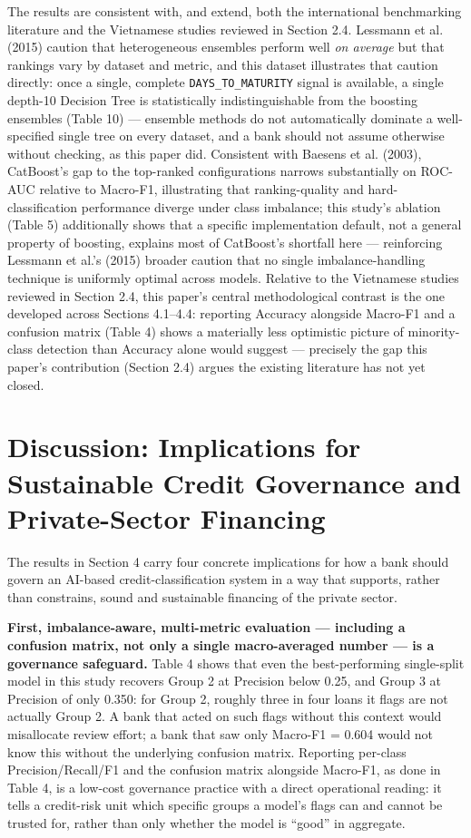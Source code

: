 \documentclass[11pt,a4paper]{article}
\begin{document}
The results are consistent with, and extend, both the international benchmarking literature and the Vietnamese studies reviewed in Section 2.4. Lessmann et al. (2015) caution that heterogeneous ensembles perform well \textit{on average} but that rankings vary by dataset and metric, and this dataset illustrates that caution directly: once a single, complete \texttt{DAYS\_TO\_MATURITY} signal is available, a single depth-10 Decision Tree is statistically indistinguishable from the boosting ensembles (Table 10) --- ensemble methods do not automatically dominate a well-specified single tree on every dataset, and a bank should not assume otherwise without checking, as this paper did. Consistent with Baesens et al. (2003), CatBoost's gap to the top-ranked configurations narrows substantially on ROC-AUC relative to Macro-F1, illustrating that ranking-quality and hard-classification performance diverge under class imbalance; this study's ablation (Table 5) additionally shows that a specific implementation default, not a general property of boosting, explains most of CatBoost's shortfall here --- reinforcing Lessmann et al.'s (2015) broader caution that no single imbalance-handling technique is uniformly optimal across models. Relative to the Vietnamese studies reviewed in Section 2.4, this paper's central methodological contrast is the one developed across Sections 4.1--4.4: reporting Accuracy alongside Macro-F1 and a confusion matrix (Table 4) shows a materially less optimistic picture of minority-class detection than Accuracy alone would suggest --- precisely the gap this paper's contribution (Section 2.4) argues the existing literature has not yet closed.

\section{Discussion: Implications for Sustainable Credit Governance and Private-Sector Financing}

The results in Section 4 carry four concrete implications for how a bank should govern an AI-based credit-classification system in a way that supports, rather than constrains, sound and sustainable financing of the private sector.

\textbf{First, imbalance-aware, multi-metric evaluation --- including a confusion matrix, not only a single macro-averaged number --- is a governance safeguard.} Table 4 shows that even the best-performing single-split model in this study recovers Group 2 at Precision below 0.25, and Group 3 at Precision of only 0.350: for Group 2, roughly three in four loans it flags are not actually Group 2. A bank that acted on such flags without this context would misallocate review effort; a bank that saw only Macro-F1 = 0.604 would not know this without the underlying confusion matrix. Reporting per-class Precision/Recall/F1 and the confusion matrix alongside Macro-F1, as done in Table 4, is a low-cost governance practice with a direct operational reading: it tells a credit-risk unit which specific groups a model's flags can and cannot be trusted for, rather than only whether the model is ``good'' in aggregate.
\end{document}
